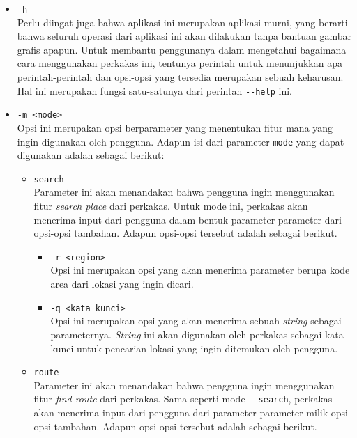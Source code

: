 \begin{itemize}
	\item \verb|-h|\\
	Perlu diingat juga bahwa aplikasi ini merupakan aplikasi \cl murni, yang berarti bahwa seluruh operasi dari aplikasi ini akan dilakukan tanpa bantuan gambar grafis apapun. Untuk membantu penggunanya dalam mengetahui bagaimana cara menggunakan perkakas ini, tentunya perintah untuk menunjukkan apa perintah-perintah dan opsi-opsi yang tersedia merupakan sebuah keharusan. Hal ini merupakan fungsi satu-satunya dari perintah \verb|--help| ini.
	
	\item \verb|-m <mode>|\\
	Opsi ini merupakan opsi berparameter yang menentukan fitur mana yang ingin digunakan oleh pengguna. Adapun isi dari parameter \verb|mode| yang dapat digunakan adalah sebagai berikut:
	
	\begin{itemize}	
		\item \verb|search|\\
		Parameter ini akan menandakan bahwa pengguna ingin menggunakan fitur \textit{search place} dari perkakas. Untuk mode ini, perkakas akan menerima input dari pengguna dalam bentuk parameter-parameter dari opsi-opsi tambahan. Adapun opsi-opsi tersebut adalah sebagai berikut.
			
		\begin{itemize}
			\item \verb|-r <region>|\\
			Opsi ini merupakan opsi yang akan menerima parameter berupa kode area dari lokasi yang ingin dicari.
			\item \verb|-q <kata kunci>|\\
			Opsi ini merupakan opsi yang akan menerima sebuah \textit{string} sebagai parameternya. \textit{String} ini akan digunakan oleh perkakas sebagai kata kunci untuk pencarian lokasi yang ingin ditemukan oleh pengguna.
		\end{itemize}
	
		\item \verb|route|\\
		Parameter ini akan menandakan bahwa pengguna ingin menggunakan fitur \textit{find route} dari perkakas. Sama seperti mode \verb|--search|, perkakas akan menerima input dari pengguna dari parameter-parameter milik opsi-opsi tambahan. Adapun opsi-opsi tersebut adalah sebagai berikut.
		

\end{itemize}
\end{itemize}
